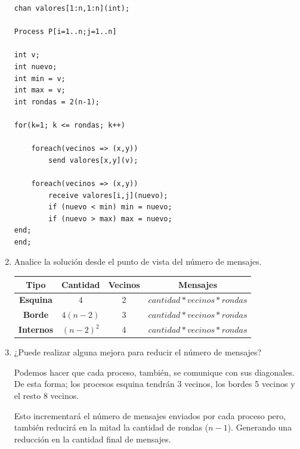 \documentclass[a4paper, 10pt]{article}
\newenvironment{QandA}{
    \begin{enumerate}\bfseries}
    {\end{enumerate}
}
\newenvironment{answered}{\par\normalfont}{}
\begin{document}
\begin{QandA}
\begin{enumerate}
\begin{lstlisting}
chan valores[1:n,1:n](int);

Process P[i=1..n;j=1..n]

int v;
int nuevo;
int min = v;
int max = v;
int rondas = 2(n-1);

for(k=1; k <= rondas; k++)

    foreach(vecinos => (x,y))
        send valores[x,y](v);

    foreach(vecinos => (x,y))
        receive valores[i,j](nuevo);
        if (nuevo < min) min = nuevo;
        if (nuevo > max) max = nuevo;
end;
end;
\end{lstlisting}


\item Analice la solución desde el punto de vista del número de mensajes.
\begin{answered}

{\renewcommand{\arraystretch}{2}%
\begin{center}
\begin{tabular}{c c c c}
\textbf{Tipo} &  \textbf{Cantidad} & \textbf{Vecinos} & \textbf{Mensajes} \\
\hline
\textbf{Esquina} & 4 & 2 & $cantidad * vecinos * rondas$ \\
\hline
\textbf{Borde} & $4(n-2)$ & 3 & $cantidad * vecinos * rondas$ \\
\hline
\textbf{Internos} & $(n-2)^2$ & 4 & $cantidad * vecinos * rondas$\\
\end{tabular}
\end{center}}
\end{answered}

\item ¿Puede realizar alguna mejora para reducir el número de mensajes?
\begin{answered}
Podemos hacer que cada proceso, también, se comunique con sus diagonales. De esta forma; los procesos esquina tendrán 3 vecinos, los bordes 5 vecinos y el resto 8 vecinos.

Esto incrementará el número de mensajes enviados por cada proceso pero, también reducirá en la mitad la cantidad de rondas ($n-1$). Generando una reducción en la cantidad final de mensajes.


\end{answered}
\end{enumerate}
\end{QandA}
\end{document}
